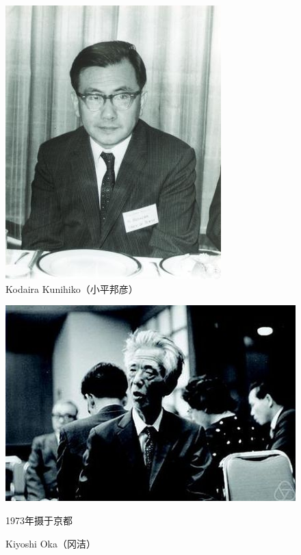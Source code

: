\documentclass[14pt,reqno]{amsart}
\numberwithin{equation}{section}
\begin{document}
\begin{figure}
	\centering
	\includegraphics{Kodaira_Kunihiko.jpg}
	\caption{Kodaira Kunihiko（小平邦彦）}
\end{figure} 
\begin{figure}
	\centering
	\includegraphics{440px-Kiyoshi_Oka.jpg}
	\caption{Kiyoshi Oka（冈洁）}
    1973年摄于京都
\end{figure} 
\end{document}
